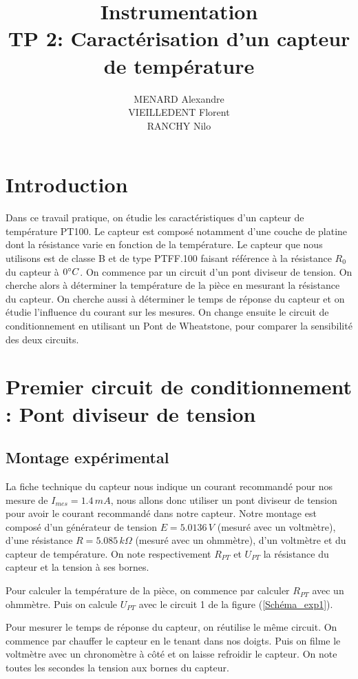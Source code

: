 \documentclass[12pt]{article}
\title{\textbf{Instrumentation} \\ TP 2: Caractérisation d'un capteur de température}
\author{MENARD Alexandre \\ VIEILLEDENT Florent \\ RANCHY Nilo}
\begin{document}
\maketitle

\section*{Introduction}
Dans ce travail pratique, on étudie les caractéristiques d'un capteur de température PT100. Le capteur est composé notamment d'une couche de platine dont la résistance varie en fonction de la température. Le capteur que nous utilisons est de classe B et de type PTFF.100 faisant référence à la résistance $R_0$ du capteur à $0\degree C$. On commence par un circuit d'un pont diviseur de tension. On cherche alors à déterminer la température de la pièce en mesurant la résistance du capteur. On cherche aussi à déterminer le temps de réponse du capteur et on étudie l'influence du courant sur les mesures. On change ensuite le circuit de conditionnement en utilisant un Pont de Wheatstone, pour comparer la sensibilité des deux circuits.

\section{Premier circuit de conditionnement : Pont diviseur de tension}
\subsection{Montage expérimental}
La fiche technique du capteur nous indique un courant recommandé pour nos mesure de $I_{mes}=1.4\, mA$, nous allons donc utiliser un pont diviseur de tension pour avoir le courant recommandé dans notre capteur. Notre montage est composé d'un générateur de tension $E=5.0136\, V$ (mesuré avec un voltmètre), d'une résistance $R=5.085 \, k\Omega$ (mesuré avec un ohmmètre), d'un voltmètre et du capteur de température. On note respectivement $R_{PT}$ et $U_{PT}$ la résistance du capteur et la tension à ses bornes. 

Pour calculer la température de la pièce, on commence par calculer $R_{PT}$ avec un ohmmètre. Puis on calcule $U_{PT}$ avec le circuit 1 de la figure (\ref{Schéma_exp1}).

Pour mesurer le temps de réponse du capteur, on réutilise le même circuit. On commence par chauffer le capteur en le tenant dans nos doigts. Puis on filme le voltmètre avec un chronomètre à côté et on laisse refroidir le capteur. On note toutes les secondes la tension aux bornes du capteur.  
\end{document}
